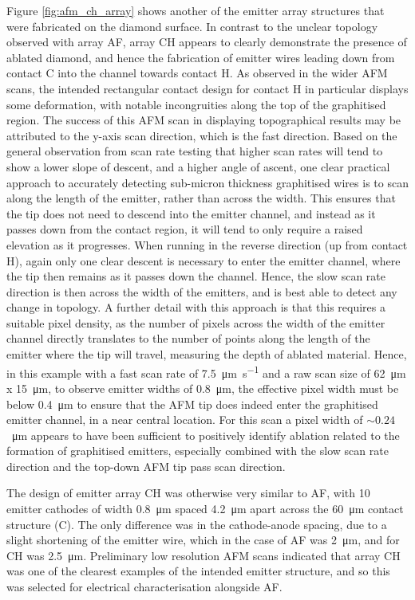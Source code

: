 \begin{refsection}
Figure \ref{fig:afm_ch_array} shows another of the emitter array structures that were fabricated on the diamond surface. In contrast to the unclear topology observed with array AF, array CH appears to clearly demonstrate the presence of ablated diamond, and hence the fabrication of emitter wires leading down from contact C into the channel towards contact H. As observed in the wider AFM scans, the intended rectangular contact design for contact H in particular displays some deformation, with notable incongruities along the top of the graphitised region. The success of this AFM scan in displaying topographical results may be attributed to the y-axis scan direction, which is the fast direction. Based on the general observation from scan rate testing that higher scan rates will tend to show a lower slope of descent, and a higher angle of ascent, one clear practical approach to accurately detecting sub-micron thickness graphitised wires is to scan along the length of the emitter, rather than across the width. This ensures that the tip does not need to descend into the emitter channel, and instead as it passes down from the contact region, it will tend to only require a raised elevation as it progresses. When running in the reverse direction (up from contact H), again only one clear descent is necessary to enter the emitter channel, where the tip then remains as it passes down the channel. Hence, the slow scan rate direction is then across the width of the emitters, and is best able to detect any change in topology. A further detail with this approach is that this requires a suitable pixel density, as the number of pixels across the width of the emitter channel directly translates to the number of points along the length of the emitter where the tip will travel, measuring the depth of ablated material. Hence, in this example with a fast scan rate of 7.5~\si{\micro\metre\per\second} and a raw scan size of 62~\si{\micro\metre} x 15~\si{\micro\metre}, to observe emitter widths of 0.8~\si{\micro\metre}, the effective pixel width must be below 0.4~\si{\micro\metre} to ensure that the AFM tip does indeed enter the graphitised emitter channel, in a near central location. For this scan a pixel width of $\sim0.24$~\si{\micro\metre} appears to have been sufficient to positively identify ablation related to the formation of graphitised emitters, especially combined with the slow scan rate direction and the top-down AFM tip pass scan direction.

The design of emitter array CH was otherwise very similar to AF, with 10 emitter cathodes of width 0.8~\si{\micro\metre} spaced 4.2~\si{\micro\metre} apart across the 60~\si{\micro\metre} contact structure (C). The only difference was in the cathode-anode spacing, due to a slight shortening of the emitter wire, which in the case of AF was 2~\si{\micro\metre}, and for CH was 2.5~\si{\micro\metre}. Preliminary low resolution AFM scans indicated that array CH was one of the clearest examples of the intended emitter structure, and so this was selected for electrical characterisation alongside AF.


\end{refsection}
